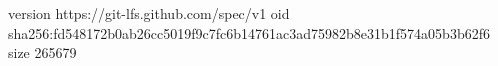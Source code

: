 version https://git-lfs.github.com/spec/v1
oid sha256:fd548172b0ab26cc5019f9c7fc6b14761ac3ad75982b8e31b1f574a05b3b62f6
size 265679
